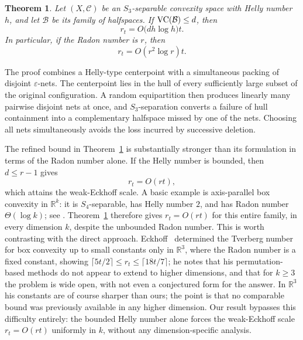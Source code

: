 \documentclass[11pt]{article}
\newtheorem{thm}{Theorem}[section]%
\theoremstyle{definition}
\newcommand{\C}{\mathcal{C}}
\newcommand{\B}{\mathcal{B}}
\renewcommand{\Re}{\mathbb{R}}
\newcommand{\VC}{\textup{VC}}
\begin{document}
\begin{thm}\label{thm:separable}
Let $(X,\C)$ be an $S_3$-separable convexity space with Helly number $h$, and let $\B$ be its family of halfspaces. If $\VC(\B)\le d$, then
\[
r_t=O\bigl(dh\log h\bigr)t.
\]
In particular, if the Radon number is $r$, then
\[
r_t=O(r^2\log r)t.
\]
\end{thm}

The proof combines a Helly-type centerpoint with a simultaneous packing of disjoint $\varepsilon$-nets. The centerpoint lies in the hull of every sufficiently large subset of the original configuration. A random equipartition then produces linearly many pairwise disjoint nets at once, and $S_3$-separation converts a failure of hull containment into a complementary halfspace missed by one of the nets. Choosing all nets simultaneously avoids the loss incurred by successive deletion.

The refined bound in Theorem~\ref{thm:separable} is substantially
stronger than its formulation in terms of the Radon number alone. If
the Helly number is bounded, then $d\le r-1$ gives
\[
r_t=O(rt),
\]
which attains the weak-Eckhoff scale. A basic example is
axis-parallel box convexity in $\Re^k$: it is $S_4$-separable, has
Helly number $2$, and has Radon number $\Theta(\log k)$; see
\cite{Eckhoff2001, holmsen2024helly}. Theorem~\ref{thm:separable} therefore gives
$r_t=O(rt)$ for this entire family, in every dimension $k$, despite the
unbounded Radon number. This is worth contrasting with the direct
approach. Eckhoff~\cite{Eckhoff2001} determined the Tverberg number for box convexity
up to small constants only in $\Re^3$, where the Radon number is a fixed
constant, showing $\lceil 5t/2\rceil\le r_t\le\lceil 18t/7\rceil$; he
notes that his permutation-based methods do not appear to extend to
higher dimensions, and that for $k\ge3$ the problem is wide open, with
not even a conjectured form for the answer. In $\Re^3$ his constants are
of course sharper than ours; the point is that no comparable bound was
previously available in any higher dimension. Our result bypasses this
difficulty entirely: the bounded Helly number alone forces the
weak-Eckhoff scale $r_t=O(rt)$ uniformly in $k$, without any
dimension-specific analysis.
\end{document}
